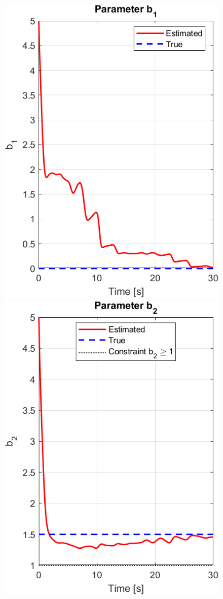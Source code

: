 \documentclass[12pt]{article} %
\numberwithin{equation}{section}  %
\begin{document}
\begin{figure}[ht!]
    \centering
    \begin{minipage}{0.48\textwidth}
        \centering
        \includegraphics[width=0.55\linewidth]{plots/plot6_10_b1_o1.png}
    \end{minipage}
    \hfill
    \begin{minipage}{0.48\textwidth}
        \centering
        \includegraphics[width=0.55\linewidth]{plots/plot6_11_b2_o1.png}
    \end{minipage}
    
    \vspace{1em} %
    

\end{figure}
\end{document}
